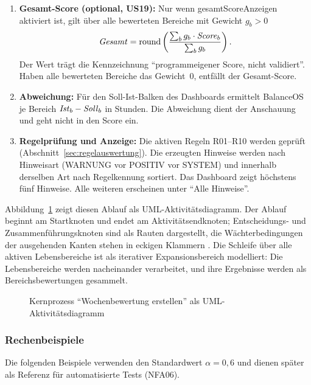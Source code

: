 \begin{enumerate}
  \[ \Score_b = \mathrm{round}\bigl(100 \cdot (\alpha \cdot z_b + (1-\alpha) \cdot s_b)\bigr), \qquad \text{ohne } s_b\text{:} \quad \Score_b = \mathrm{round}(100 \cdot z_b). \]
  BalanceOS rundet kaufmännisch auf eine ganze Zahl. Ein Nachkommaanteil von genau 0,5 wird also stets aufgerundet (72,5 ergibt 73) und nicht auf die nächste gerade Zahl gerundet. Zwischenergebnisse werden ungerundet weiterverwendet. Die Oberfläche zeigt Stunden mit einer Nachkommastelle an.
  \item \textbf{Gesamt-Score (optional, US19):} Nur wenn gesamtScoreAnzeigen aktiviert ist, gilt über alle bewerteten Bereiche mit Gewicht $g_b > 0$
  \[ \mathit{Gesamt} = \mathrm{round}\left(\frac{\sum_b g_b \cdot \mathit{Score}_b}{\sum_b g_b}\right). \]
  Der Wert trägt die Kennzeichnung \enquote{programmeigener Score, nicht validiert}. Haben alle bewerteten Bereiche das Gewicht~0, entfällt der Gesamt-Score.
  \item \textbf{Abweichung:} Für den Soll-Ist-Balken des Dashboards ermittelt BalanceOS je Bereich $\mathit{Ist}_b - \mathit{Soll}_b$ in Stunden. Die Abweichung dient der Anschauung und geht nicht in den Score ein.
  \item \textbf{Regelprüfung und Anzeige:} Die aktiven Regeln R01--R10 werden geprüft (Abschnitt~\ref{sec:regelauswertung}). Die erzeugten Hinweise werden nach Hinweisart (WARNUNG vor POSITIV vor SYSTEM) und innerhalb derselben Art nach Regelkennung sortiert. Das Dashboard zeigt höchstens fünf Hinweise. Alle weiteren erscheinen unter \enquote{Alle Hinweise}.
\end{enumerate}

Abbildung~\ref{abb:aktivitaet} zeigt diesen Ablauf als \ac{UML}-Aktivitätsdiagramm. Der Ablauf beginnt am Startknoten und endet am Aktivitätsendknoten; Entscheidungs- und Zusammenführungsknoten sind als Rauten dargestellt, die Wächterbedingungen der ausgehenden Kanten stehen in eckigen Klammern \parencite[S.~379, 391]{omg2017uml}. Die Schleife über alle aktiven Lebensbereiche ist als iterativer Expansionsbereich modelliert: Die Lebensbereiche werden nacheinander verarbeitet, und ihre Ergebnisse werden als Bereichsbewertungen gesammelt.

\begin{figure}[H]
  \caption{Kernprozess \enquote{Wochenbewertung erstellen} als UML-Aktivitätsdiagramm}\label{abb:aktivitaet}
  \centering
\end{figure}

\subsubsection{Rechenbeispiele}
Die folgenden Beispiele verwenden den Standardwert $\alpha = 0{,}6$ und dienen später als Referenz für automatisierte Tests (NFA06).

